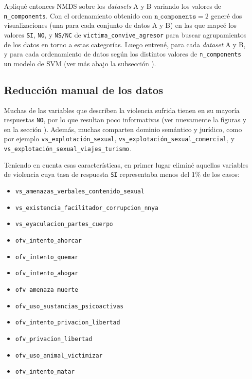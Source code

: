 \documentclass[10 pt]{article}
\begin{document}
Apliqué entonces NMDS sobre los \textit{datasets} A y B variando los valores de \texttt{n\_components}. Con el ordenamiento obtenido con \(\texttt{n\_components} = 2\) generé dos visualizaciones (una para cada conjunto de datos A y B) en las que mapeé los valores \texttt{SI}, \texttt{NO}, y \texttt{NS/NC} de \texttt{victima\_convive\_agresor} para buscar agrupamientos de los datos en torno a estas categorías. Luego entrené, para cada \textit{dataset} A y B, y para cada ordenamiento de datos según los distintos valores de \texttt{n\_components} un modelo de SVM (ver más abajo la subsección ).


\subsection{Reducción manual de los datos}\label{reduccionmanual}

Muchas de las variables que describen la violencia sufrida tienen en su mayoría respuestas \texttt{NO}, por lo que resultan poco informativas (ver nuevamente la figuras  y  en la sección ). Además, muchas comparten dominio semántico y jurídico, como por ejemplo \texttt{vs\_explotación\_sexual}, \texttt{vs\_explotación\_sexual\_comercial}, y \texttt{vs\_explotación\_sexual\_viajes\_turismo}. 

Teniendo en cuenta esas características, en primer lugar eliminé aquellas variables de violencia cuya tasa de respuesta \texttt{SI} representaba menos del 1\% de los casos:
\begin{multicols}{2}
\begin{itemize}
    \item \texttt{vs\_amenazas\_verbales\_contenido\_sexual} 
    \item \texttt{vs\_existencia\_facilitador\_corrupcion\_nnya}
    \item \texttt{vs\_eyaculacion\_partes\_cuerpo}
    \item \texttt{ofv\_intento\_ahorcar}
    \item \texttt{ofv\_intento\_quemar}
    \item \texttt{ofv\_intento\_ahogar}
    \item \texttt{ofv\_amenaza\_muerte}
    \item \texttt{ofv\_uso\_sustancias\_psicoactivas} 
    \item \texttt{ofv\_intento\_privacion\_libertad}
    \item \texttt{ofv\_privacion\_libertad}
    \item \texttt{ofv\_uso\_animal\_victimizar}
    \item \texttt{ofv\_intento\_matar}
\end{itemize}
\end{multicols} 
\end{document}
